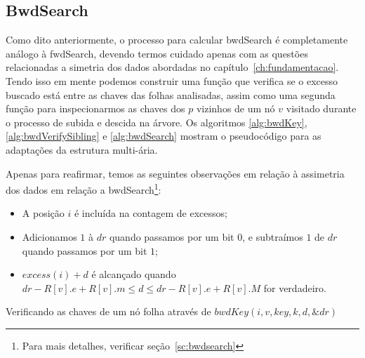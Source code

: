 \subsection{BwdSearch}\label{sec:bwdSearch}
Como dito anteriormente, o processo para calcular bwdSearch é completamente análogo à fwdSearch, devendo termos cuidado apenas com as questões relacionadas a
simetria dos dados abordadas no capítulo~\ref{ch:fundamentacao}. Tendo isso em mente podemos construir uma função que verifica se o excesso buscado está entre as chaves das
folhas analisadas, assim como uma segunda função para inspecionarmos as chaves dos $p$ vizinhos de um nó $v$ visitado durante o processo de subida e descida na árvore.
Os algoritmos \ref{alg:bwdKey}, \ref{alg:bwdVerifySibling} e \ref{alg:bwdSearch} mostram o pseudocódigo para as adaptações da estrutura multi-ária.

Apenas para reafirmar, temos as seguintes observações em relação à assimetria dos dados em relação a bwdSearch\footnote{Para mais detalhes, verificar seção~\ref{sc:bwdsearch}}:
\begin{itemize}
    \item A posição $i$ é incluída na contagem de excessos;
    \item Adicionamos $1$ à $dr$ quando passamos por um bit $0$, e subtraímos $1$ de $dr$ quando passamos por um bit $1$;
    \item $excess(i) + d $ é alcançado quando $dr - R[v].e + R[v].m \leq d \leq dr - R[v].e + R[v].M $ for verdadeiro.
\end{itemize}

\begin{algorithm}[h!]
    \vspace{.3cm}
\caption{Verificando as chaves de um nó folha através de  $bwdKey(i,v,key,k,d,\&dr)$}
\label{alg:bwdKey}
\end{algorithm}

